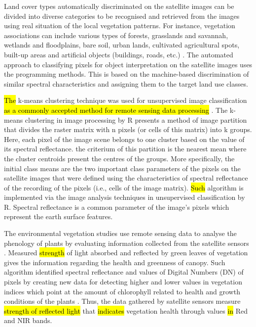 \documentclass[12pt,a4paper,oneside]{article}
\def \newpar{\vspace{6pt}}
\begin{document}
\newpar Land cover types automatically discriminated on the satellite images can be divided into diverse categories to be recognised and retrieved from the images using real situation of the local vegetation patterns. For instance, vegetation associations can include various types of forests, grasslands and savannah, wetlands and floodplains, bare soil, urban lands, cultivated agricultural spots, built-up areas and artificial objects (buildings, roads, etc.) \citep{lillesand1994remote}. The automated approach to classifying pixels for object interpretation on the satellite images uses the programming methods. This is\hl{ }based on the machine-based discrimination of\hl{ }similar spectral characteristics and assigning them to the target land use classes.

\newpar \hl{The} k-means clustering technique was used for unsupervised image classification \hl{as a commonly accepted method for remote sensing data processing} \citep{PAOLAPATRICIA2020129,1027191,BOVOLO2018156,HOU201625}. The k-means clustering in image processing by R presents a method of image partition that divides the raster matrix with n pixels (or cells of this matrix) into k groups. Here, each pixel of the image scene belongs to one cluster based on the value of its spectral reflectance. the criterium of this partition is the nearest mean where the cluster centroids present the centres of the groups. More specifically, the initial class means are the two important class parameters of the pixels on the satellite images that were defined using the characteristics of spectral reflectance of the recording of the pixels (i.e., cells of the image matrix). \hl{Such} algorithm is implemented via the image analysis techniques in unsupervised classification by R. Spectral reflectance is a common parameter of the image's pixels which represent the earth surface features.

\newpar The environmental vegetation studies use remote sensing data to analyse the phenology of plants by evaluating information collected from the satellite sensors \citep{rs9050463,rs9050485}. Measured \hl{strength} of light absorbed and reflected by green leaves of vegetation gives the information regarding the health and greenness of canopy. Such algorithm identified spectral reflectance and values of Digital Numbers (DN) of pixels by creating new data for detecting higher and lower values in vegetation indices which point at the amount of chlorophyll related to health and growth conditions of the plants \citep{jmse11040871,jimaging9050093}. Thus, the data gathered by satellite sensors measure \hl{strength of reflected light} that \hl{indicates} vegetation health through\hl{ }values \hl{in} Red and NIR bands.
\end{document}
